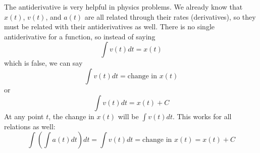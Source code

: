 \documentclass[../revisedmain.tex]{subfiles}
\begin{document}
The antiderivative is very helpful in physics problems. We already know that $x(t)$, $v(t)$, and $a(t)$ are all related through their rates (derivatives), so they must be related with their antiderivatives as well. There is no single antiderivative for a function, so instead of saying $$\int v(t) dt=x(t)$$ which is false, we can say$$\int v(t)dt=\text{change in }x(t)$$or$$\int v(t)dt=x(t)+C$$At any point $t$, the change in $x(t)$ will be $\int v(t) dt$. This works for all relations as well:$$\int\left(\int a(t) dt\right)dt=\int v(t)dt=\text{change in }x(t)=x(t)+C$$
\end{document}
